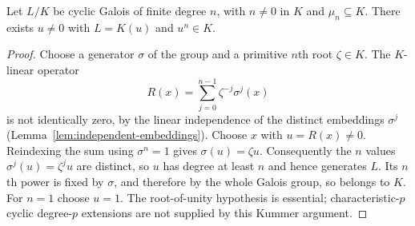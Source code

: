 \begin{theorem}
Let $L/K$ be cyclic Galois of finite degree $n$, with $n\ne0$ in $K$ and $\mu_n\subseteq K$. There exists $u\ne0$ with $L=K(u)$ and $u^n\in K$.
\end{theorem}
\begin{proof}
Choose a generator $\sigma$ of the group and a primitive $n$th root $\zeta\in K$. The $K$-linear operator
\[R(x)=\sum_{j=0}^{n-1}\zeta^{-j}\sigma^j(x)
\]
is not identically zero, by the linear independence of the distinct embeddings $\sigma^j$ (Lemma~\ref{lem:independent-embeddings}). Choose $x$ with $u=R(x)\ne0$. Reindexing the sum using $\sigma^n=1$ gives $\sigma(u)=\zeta u$. Consequently the $n$ values $\sigma^j(u)=\zeta^j u$ are distinct, so $u$ has degree at least $n$ and hence generates $L$. Its $n$th power is fixed by $\sigma$, and therefore by the whole Galois group, so belongs to $K$. For $n=1$ choose $u=1$. The root-of-unity hypothesis is essential; characteristic-$p$ cyclic degree-$p$ extensions are not supplied by this Kummer argument.
\end{proof}

